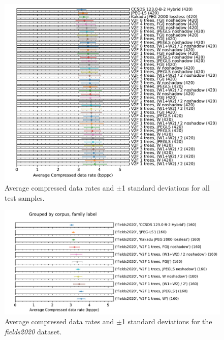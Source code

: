 \documentclass{class/technicalReportUAB}
\begin{document}
\begin{figure}[h]
\begin{center}
\includegraphics[width=\linewidth]{./plots/lossless/ScalarNumericAnalyzer-bpppc-histogram-groupby__family_label.pdf}
\end{center}
\caption{Average compressed data rates and $\pm$1 standard deviations for all test samples.}
\label{fig:lossless_bpppc}
\end{figure}

\begin{figure}[h]
\begin{center}
\includegraphics[width=0.9\linewidth]{./plots/lossless/fields_bpppc_histogram.pdf}
\end{center}
\caption{Average compressed data rates and $\pm$1 standard deviations for the \textit{fields2020} dataset.}
\label{fig:lossless_bpppc_fields}
\end{figure}
\end{document}
